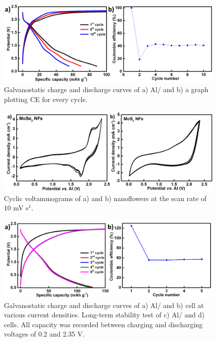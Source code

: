 \begin{figure}[h!]
  \centering
  \includegraphics[width=\textwidth]{Figures/chap6fig/mose2yncdcce}
    \caption{Galvanostatic charge and discharge curves of a) Al/ and b) a graph plotting CE for every cycle.}
  \label{Figures/chap6fig:mose2yncdcce}
\end{figure}

\begin{figure}[th!]
\centering
\includegraphics[width=\textwidth]{Figures/chap6fig/mox2yncv}
\caption{Cyclic voltammograms of a) and b) nanoflowers at the scan rate of 10 mV s$^{1}$.}
\label{Figures/chap6fig:mox2yncv}
\end{figure}

\begin{figure}[h!]
  \centering
  \includegraphics[width=\textwidth]{Figures/chap6fig/mos2yncdcce}
    \caption{Galvanostatic charge and discharge curves of a) Al/ and b)  cell at various current densities. Long-term stability test of c) Al/ and d)  cells. All capacity was recorded between charging and discharging voltages of 0.2 and 2.35 V.}
  \label{Figures/chap6fig:mos2yncdcce}
\end{figure}


